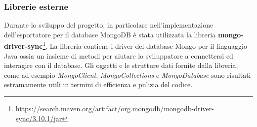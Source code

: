 \documentclass[12pt,a4paper,openright,oneside]{book}
\begin{document}
    \subsubsection{Librerie esterne}
    Durante lo sviluppo del progetto, in particolare nell'implementazione dell'esportatore per il database MongoDB è stata utilizzata la libreria \textbf{mongo-driver-sync}\footnote{\url{https://search.maven.org/artifact/org.mongodb/mongodb-driver-sync/3.10.1/jar}}.
    La libreria contiene i driver del database Mongo per il linguaggio Java ossia un insieme di metodi per aiutare lo sviluppatore a connettersi ed interagire con il database.
    Gli oggetti e le strutture dati fornite dalla libreria, come ad esempio \textit{MongoClient}, \textit{MongoCollections} e \textit{MongoDatabase} sono risultati estramamente utili in termini di efficienza e pulizia del codice.
    
\end{document}
